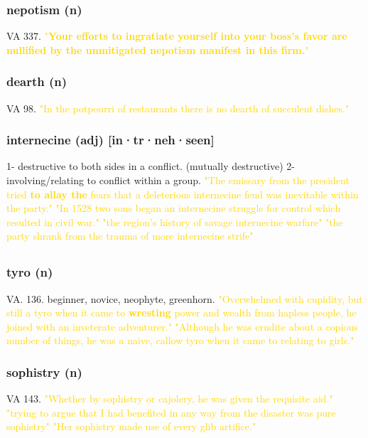 \documentclass{proc}
\begin{document}
	\subsubsection{\textcolor{brickred}{nepotism} (n)}
	VA 337.
	\textcolor{gold}{"\textbf{Your efforts to ingratiate yourself into your boss's favor are nullified by the unmitigated nepotism manifest in this firm.}"}
	
	\subsubsection{\textcolor{brickred}{dearth} (n)}
	VA 98.
	\textcolor{gold}{"In the potpourri of restaurants there is no dearth of succulent dishes."}
	
	\subsubsection{\textcolor{brickred}{internecine} (adj) [in·tr·neh·seen]}
	1- destructive to both sides in a conflict. (mutually destructive) 2- involving/relating to conflict within a group.
	\textcolor{gold}{"The emissary from the president tried \textbf{to allay the} fears that a deleterious internecine feud was inevitable within the party." "In 1528 two sons began an internecine struggle for control which resulted in civil war." "the region's history of savage internecine warfare" "the party shrank from the trauma of more internecine strife"}
	
	\newpage
	\subsection{}
	\subsubsection{\textcolor{brickred}{tyro} (n)}
	VA. 136. beginner, novice, neophyte, greenhorn.
	\textcolor{gold}{"Overwhelmed with cupidity, but still a tyro when it came to \textbf{wresting} power and wealth from hapless people, he joined with an inveterate adventurer." "Although he was erudite about a copious number of things, he was a naive, callow tyro when it came to relating to girls."}
	
	\subsubsection{\textcolor{brickred}{sophistry} (n)}
	VA 143.
	\textcolor{gold}{"Whether by sophistry or cajolery, he was given the requisite aid." "trying to argue that I had benefited in any way from the disaster was pure sophistry" "Her sophistry made use of every glib artifice."}
	
\end{document}
